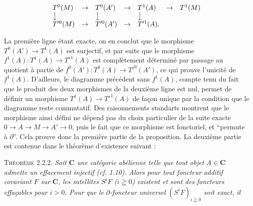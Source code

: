 \[
\begin{array}{lclclcl}
T^0(M)&\to&T^0(A')&\to&T^1(A)&\to&T^1(M)\\
\big\downarrow&&\big\downarrow&&\big\downarrow&&\\
T'^0(M)&\to&T'^0(A')&\to&T'^1(A).&&
\end{array}
\]

\noindent La première ligne étant exacte, on en conclut que le morphisme
$T^0(A')\to T^1(A)$ est surjectif, et par suite que le morphisme
$f^1(A):T^1(A)\to T'^1(A)$ est complètement déterminé par passage
au quotient à partie de
$f^0(A'):T^0(A)\to T'^0(A')$, ce qui prouve l'unicité de $f^1(A)$.
D'ailleurs, le diagramme précédent sans $f^1(A)$, compte tenu du fait que le
produit des deux morphismes de la deuxième ligne est nul, permet de définir un
morphisme $T^1(A)\to T'^1(A)$ de façon unique par la condition que
le diagramme reste commutatif. Des raisonnements standarts montrent que le
morphisme ainsi défini ne dépend pas du choix particulier de la suite exacte
$0\to A\to M\to A'\to 0$,
puis le fait que ce morphisme est fonctoriel, et
\textquotedblleft permute à $\partial$\textquotedblright. Cela prouve donc la
première partie de la proposition. La deuxième partie est contenue dans le
théorème d'existence suivant :

\indent\textsc{Théorème 2.2.2.} \textit{Soit $\mathbf{C}$ une catégorie
abélienne telle que tout objet $A\in \mathbf{C}$ admette un effacement injectif
\textup{(}\textit{cf.}\textup{ 1.10)}. Alors pour tout foncteur additif covariant $F$ sur $\mathbf{C}$, les
satellites $S^iF$ ($i\geqq0$) existent et sont des foncteurs effaçables pour
$i>0$. Pour que le $\partial$-foncteur universel $(S^iF)_{i\geqq0}$ soit exact,
il}

